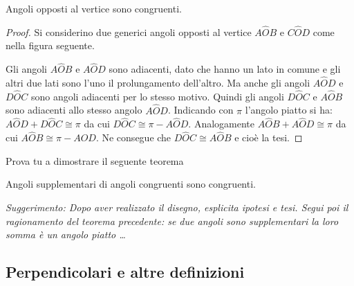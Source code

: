 \begin{inaccessibleblock}
 \begin{figure}[htb]
\centering
\end{figure}
\end{inaccessibleblock}

\begin{teorema}
Angoli opposti al vertice sono congruenti.
\end{teorema}

\begin{proof}
Si considerino due generici angoli opposti al vertice $A\widehat{O}B$ 
e $C\widehat{O}D$ come nella figura seguente.

\begin{inaccessibleblock}
 \begin{figure}[htb]
\centering
\end{figure}
\end{inaccessibleblock}
Gli angoli $A\widehat{O}B$ e $A\widehat{O}D$ sono adiacenti, dato che 
hanno un lato in comune e gli altri due lati sono l'uno il 
prolungamento dell'altro. Ma anche gli angoli $A\widehat{O}D$ e 
$D\widehat{O}C$ sono angoli adiacenti per lo stesso motivo. Quindi 
gli angoli $D\widehat{O}C$ e $A\widehat{O}B$ sono adiacenti allo 
stesso angolo $A\widehat{O}D$.
Indicando con $\pi$ l'angolo piatto si ha: $A\widehat{O}D + 
D\widehat{O}C \cong \pi$ da cui $D\widehat{O}C\cong \pi - 
A\widehat{O}D$. Analogamente $A\widehat{O}B+A\widehat{O}D\cong\pi$ da 
cui $A\widehat{O}B\cong \pi-A\widehat{O}D$. Ne consegue che 
$D\widehat{O}C\cong A\widehat{O}B$ e cioè la tesi.
\end{proof}

Prova tu a dimostrare il seguente teorema

\begin{teorema}
Angoli supplementari di angoli congruenti sono congruenti.
\end{teorema}

\emph{Suggerimento: Dopo aver realizzato il disegno, esplicita 
ipotesi e tesi. Segui poi il ragionamento del teorema precedente: se 
due angoli sono supplementari la loro somma è un angolo piatto 
\ldots{}}

\subsection{Perpendicolari e altre definizioni}


